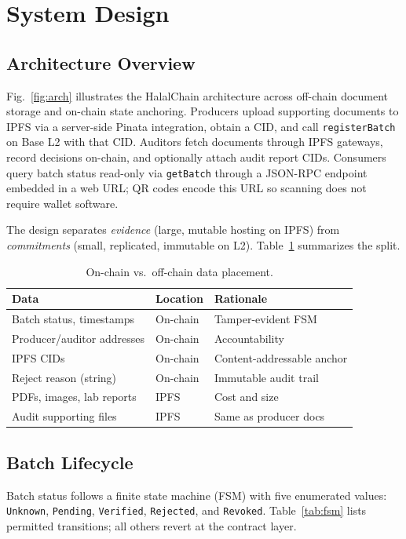 \section{System Design}
\label{sec:design}

\subsection{Architecture Overview}
Fig.~\ref{fig:arch} illustrates the HalalChain architecture across off-chain document storage and on-chain state anchoring.
Producers upload supporting documents to IPFS via a server-side Pinata integration, obtain a CID, and call \texttt{registerBatch} on Base L2 with that CID.
Auditors fetch documents through IPFS gateways, record decisions on-chain, and optionally attach audit report CIDs.
Consumers query batch status read-only via \texttt{getBatch} through a JSON-RPC endpoint embedded in a web URL; QR codes encode this URL so scanning does not require wallet software.



The design separates \emph{evidence} (large, mutable hosting on IPFS) from \emph{commitments} (small, replicated, immutable on L2).
Table~\ref{tab:datasplit} summarizes the split.

\begin{table}[t]
  \caption{On-chain vs.\ off-chain data placement.}
  \label{tab:datasplit}
  \centering
  \footnotesize
  \begin{tabularx}{\columnwidth}{@{}>{\raggedright\arraybackslash}p{}>{\raggedright\arraybackslash}p{}X@{}}
    \toprule
    \textbf{Data} & \textbf{Location} & \textbf{Rationale} \\
    \midrule
    Batch status, timestamps & On-chain & Tamper-evident FSM \\
    Producer/auditor addresses & On-chain & Accountability \\
    IPFS CIDs & On-chain & Content-addressable anchor \\
    Reject reason (string) & On-chain & Immutable audit trail \\
    PDFs, images, lab reports & IPFS & Cost and size \\
    Audit supporting files & IPFS & Same as producer docs \\
    \bottomrule
  \end{tabularx}
\end{table}

\subsection{Batch Lifecycle}
Batch status follows a finite state machine (FSM) with five enumerated values: \texttt{Unknown}, \texttt{Pending}, \texttt{Verified}, \texttt{Rejected}, and \texttt{Revoked}.
Table~\ref{tab:fsm} lists permitted transitions; all others revert at the contract layer.

